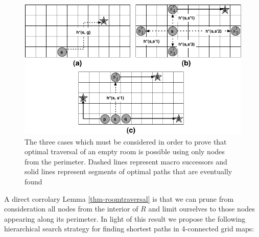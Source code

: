\begin{figure}[htbp]
	\label{fig-roomtraversal}
	\vspace{-4pt}
       \begin{center}
           \includegraphics[scale=0.34, trim = 10mm 10mm 10mm 0mm]{diagrams/roomtraversal.png}
       \end{center}
	\vspace{-3pt}
       \caption{The three cases which must be considered in order to prove that 
			optimal traversal of an empty room is possible using only nodes from the perimeter.
			Dashed lines represent macro successors and solid lines represent segments of optimal
			paths that are eventually found}
       \label{fig-ohacontrast}
	\vspace{-15pt}
\end{figure}

A direct corrolary Lemma \ref{thm-roomtraversal} is that we can prune from consideration
all nodes from the interior of $R$ and limit ourselves to those nodes appearing along its perimeter.
In light of this result we propose the following hierarchical search strategy for finding shortest 
paths in 4-connected grid maps:

